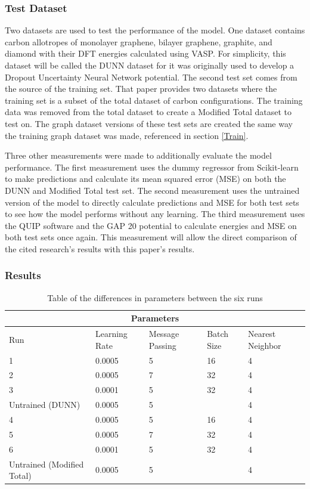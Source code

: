 \documentclass[12pt, abstract = true]{scrartcl}
\begin{document}
\subsubsection{Test Dataset} 
Two datasets are used to test the performance of the model. One dataset contains carbon allotropes of monolayer graphene, bilayer graphene, graphite, and diamond with their DFT energies calculated using VASP. For simplicity, this dataset will be called the DUNN dataset for it was originally used to develop a Dropout Uncertainty Neural Network potential\cite{dunn}. The second test set comes from the source of the training set. That paper\cite{gap20} provides two datasets where the training set is a subset of the total dataset of carbon configurations. The training data was removed from the total dataset to create a Modified Total dataset to test on. The graph dataset versions of these test sets are created the same way the training graph dataset was made, referenced in section \ref{Train}. 

Three other measurements were made to additionally evaluate the model performance. The first measurement uses the dummy regressor from Scikit-learn to make predictions and calculate its mean squared error (MSE) on both the DUNN and Modified Total test set. The second measurement uses the untrained version of the model to directly calculate predictions and MSE for both test sets to see how the model performs without any learning. The third measurement uses the QUIP software and the GAP 20 potential\cite{gap20} to calculate energies and MSE on both test sets once again. This measurement will allow the direct comparison of the cited research's results with this paper's results.

\subsubsection{Results} 

\begin{table}
    \centering
    \begin{tabular}{|p{3cm}||p{2cm}|p{2cm}|p{2cm}|p{2cm}|}
    \hline
    \multicolumn{5}{|c|}{Parameters} \\
    \hline
    Run & Learning Rate & Message Passing & Batch Size & Nearest Neighbor\\
    \hline
    1 & 0.0005 & 5 & 16 & 4\\
    2 & 0.0005 & 7 & 32 & 4\\    
    3 & 0.0001 & 5 & 32 & 4\\
    Untrained (DUNN) & 0.0005 & 5 & & 4\\
    4 & 0.0005 & 5 & 16 & 4\\
    5 & 0.0005 & 7 & 32 & 4\\
    6 & 0.0001 & 5 & 32 & 4\\
    Untrained (Modified Total) & 0.0005 & 5 & & 4\\
    \hline
    
    \end{tabular}
    \caption{Table of the differences in parameters between the six runs}\label{tab:param}
\end{table}
\end{document}

